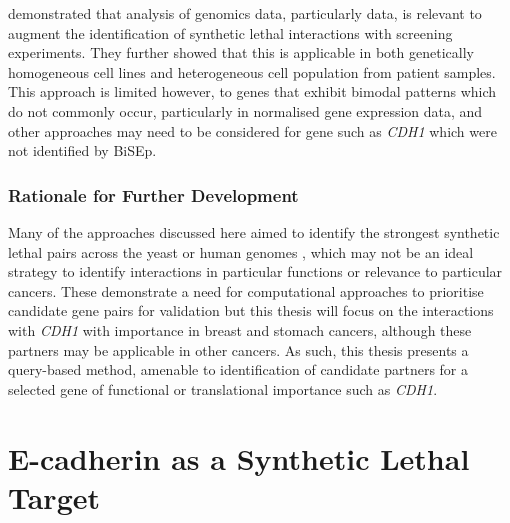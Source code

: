 \citet{Wappett2016} demonstrated that analysis of \glspl{genomic} data, particularly  data, is relevant to augment the identification of \gls{synthetic lethal} interactions with screening experiments. They further showed that this is applicable in both genetically homogeneous cell lines and heterogeneous cell population from patient samples. This approach is limited however, to genes that exhibit bimodal  patterns which do not commonly occur, particularly in normalised \gls{gene expression} data, and other approaches may need to be considered for gene such as \textit{CDH1} which were not identified by \gls{BiSEp}.


\subsubsection{Rationale for Further Development}

Many of the approaches discussed here aimed to identify the strongest \gls{synthetic lethal} pairs across the yeast or human \glspl{genome} \citep{Lu2015, Wappett2016, Deshpande2013, Wu2014}, which may not be an ideal strategy to identify interactions in particular functions or relevance to particular cancers. These demonstrate a need for computational approaches to prioritise candidate gene pairs for validation but this thesis will focus on the interactions with \textit{CDH1} with importance in breast and stomach cancers, although these partners may be applicable in other cancers. As such, this thesis presents a query-based method, amenable to identification of candidate partners for a selected gene of functional or translational importance such as \textit{CDH1}.


\section{E-cadherin as a Synthetic Lethal Target}
\label{CDH1_section}

